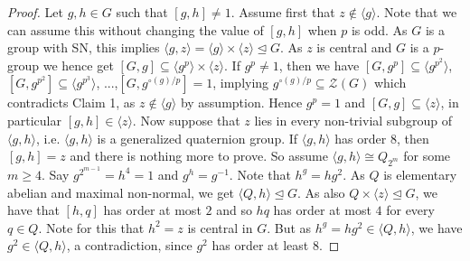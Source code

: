 \documentclass[a4paper,10pt]{amsart}
\theoremstyle{definition}
\theoremstyle{remark}
\newcommand{\ZZ}{\mathcal{Z}}
\begin{document}
\begin{proof}
Let $g,h \in G$ such that $[g,h] \neq 1$. Assume first that $z \notin \langle g \rangle$. Note that we can assume this without changing the value of $[g,h]$ when $p$ is odd. As $G$ is a group with SN, this implies $\langle g, z \rangle = \langle g \rangle \times \langle z \rangle \unlhd G$. As $z$ is central and $G$ is a $p$-group we hence get $[G,g] \subseteq \langle g^p \rangle \times \langle z \rangle$. If $g^p \neq 1$, then we have $[G, g^p] \subseteq \langle g^{p^2} \rangle$, $[G, g^{p^2}] \subseteq \langle g^{p^3} \rangle$, ...,$[G, g^{\circ(g)/p}] = 1$, implying $g^{\circ(g)/p} \subseteq \ZZ(G)$ which contradicts Claim 1, as $z \notin \langle g \rangle$ by assumption. Hence $g^p = 1$ and $[G,g] \subseteq \langle z \rangle$, in particular $[g,h] \in \langle z \rangle$. Now suppose that $z$ lies in every non-trivial subgroup of $\langle g, h \rangle$, i.e. $\langle g,h \rangle$ is a generalized quaternion group. If $\langle g,h \rangle$ has order $8$, then $[g,h] = z$ and there is nothing more to prove. So assume $\langle g,h \rangle \cong Q_{2^m}$ for some $m \geq 4$. Say $g^{2^{m-1}} = h^4 = 1$ and $g^h = g^{-1}$. Note that $h^g = hg^2$. As $Q$ is elementary abelian and maximal non-normal, we get $\langle Q, h \rangle \unlhd G$. As also $Q  \times\langle z \rangle \unlhd G$, we have that $[h,q]$ has order at most $2$ and so $hq$ has order at most $4$ for every $q \in Q$. Note for this that $h^2 = z$ is central in $G$. But as $h^g = hg^2 \in \langle Q, h\rangle$, we have $g^2 \in \langle Q, h \rangle$, a contradiction, since $g^2$ has order at least $8$.


\end{proof}
\end{document}
